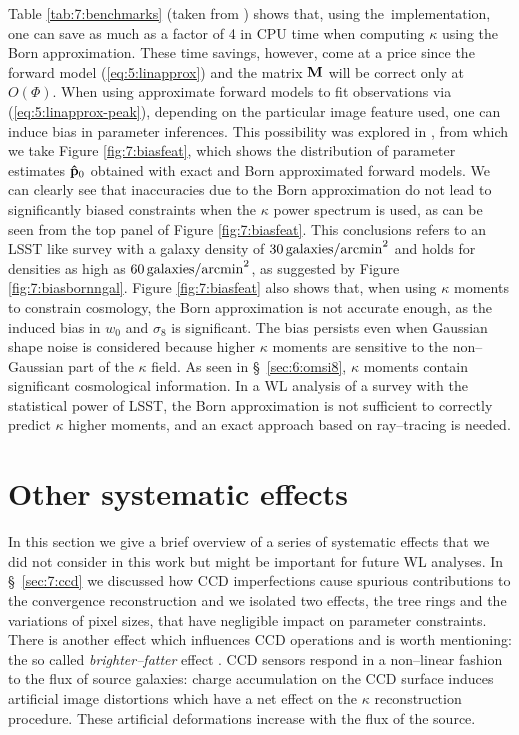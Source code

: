 Table \ref{tab:7:benchmarks} (taken from \citep{PetriBorn}) shows that, using the \LT\,implementation, one can save as much as a factor of 4 in CPU time when computing $\kappa$ using the Born approximation. These time savings, however, come at a price since the forward model (\ref{eq:5:linapprox}) and the matrix $\mathbf{M}$ will be correct only at $O(\Phi)$. When using approximate forward models to fit observations via (\ref{eq:5:linapprox-peak}), depending on the particular image feature used, one can induce bias in parameter inferences. This possibility was explored in \citep{PetriBorn}, from which we take Figure \ref{fig:7:biasfeat}, which shows the distribution of parameter estimates $\mathbf{\hat{p}}_0$ obtained with exact and Born approximated forward models. We can clearly see that inaccuracies due to the Born approximation do not lead to significantly biased constraints when the $\kappa$ power spectrum is used, as can be seen from the top panel of Figure \ref{fig:7:biasfeat}. This conclusions refers to an LSST like survey with a galaxy density of $30\,{\rm galaxies/arcmin}^2$ and holds for densities as high as $60\,{\rm galaxies/arcmin}^2$, as suggested by Figure \ref{fig:7:biasbornngal}. Figure \ref{fig:7:biasfeat} also shows that, when using $\kappa$ moments to constrain cosmology, the Born approximation is not accurate enough, as the induced bias in $w_0$ and $\sigma_8$ is significant. The bias persists even when Gaussian shape noise is considered because higher $\kappa$ moments are sensitive to the non--Gaussian part of the $\kappa$ field. As seen in \S~\ref{sec:6:omsi8}, $\kappa$ moments contain significant cosmological information. In a WL analysis of a survey with the statistical power of LSST, the Born approximation is not sufficient to correctly predict $\kappa$ higher moments, and an exact approach based on ray--tracing is needed. 

\section{Other systematic effects}
In this section we give a brief overview of a series of systematic effects that we did not consider in this work but might be important for future WL analyses. In \S~\ref{sec:7:ccd} we discussed how CCD imperfections cause spurious contributions to the convergence reconstruction and we isolated two effects, the tree rings and the variations of pixel sizes, that have negligible impact on parameter constraints. There is another effect which influences CCD operations and is worth mentioning: the so called \textit{brighter--fatter} effect \citep{BrightFat}. CCD sensors respond in a non--linear fashion to the flux of source galaxies: charge accumulation on the CCD surface induces artificial image distortions which have a net effect on the $\kappa$ reconstruction procedure. These artificial deformations increase with the flux of the source.

